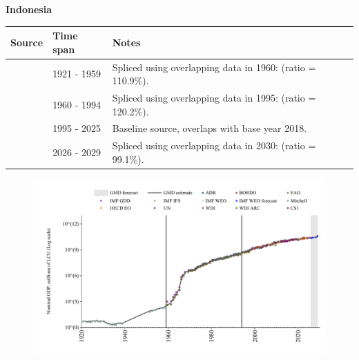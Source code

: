 \documentclass[12pt,a4paper,landscape]{article}
\begin{document}
\begin{adjustbox}{max totalsize={\paperwidth}{\paperheight},center}
\begin{minipage}[t][\textheight][t]{\textwidth}
\vspace*{0.5cm}
{}
\begin{center}
{\Large\bfseries Indonesia}
\end{center}
\vspace{0.5cm}
\begin{table}[H]
\centering
\small
\begin{tabular}{|l|l|l|}
\hline
\textbf{Source} & \textbf{Time span} & \textbf{Notes} \\
\hline
\rowcolor{white}\cite{Mitchell}& 1921 - 1959 &Spliced using overlapping data in 1960: (ratio = 110.9\%).\\
\rowcolor{lightgray}\cite{WDI}& 1960 - 1994 &Spliced using overlapping data in 1995: (ratio = 120.2\%).\\
\rowcolor{white}\cite{OECD_EO}& 1995 - 2025 &Baseline source, overlaps with base year 2018.\\
\rowcolor{lightgray}\cite{IMF_WEO_forecast}& 2026 - 2029 &Spliced using overlapping data in 2030: (ratio = 99.1\%).\\
\hline
\end{tabular}
\end{table}
\begin{figure}[H]
\centering
\includegraphics[width=\textwidth,height=0.6\textheight,keepaspectratio]{graphs/IDN_nGDP.pdf}
\end{figure}
\end{minipage}
\end{adjustbox}
\end{document}
